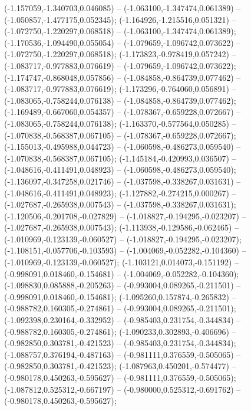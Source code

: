  (-1.157059,-1.340703,0.046085) -- (-1.063100,-1.347474,0.061389) -- (-1.050857,-1.477175,0.052345);
 (-1.164926,-1.215516,0.051321) -- (-1.072750,-1.220297,0.068518) -- (-1.063100,-1.347474,0.061389);
 (-1.170536,-1.094490,0.055054) -- (-1.079659,-1.096742,0.073622) -- (-1.072750,-1.220297,0.068518);
 (-1.173823,-0.978419,0.057242) -- (-1.083717,-0.977883,0.076619) -- (-1.079659,-1.096742,0.073622);
 (-1.174747,-0.868048,0.057856) -- (-1.084858,-0.864739,0.077462) -- (-1.083717,-0.977883,0.076619);
 (-1.173296,-0.764060,0.056891) -- (-1.083065,-0.758244,0.076138) -- (-1.084858,-0.864739,0.077462);
 (-1.169489,-0.667060,0.054357) -- (-1.078367,-0.659228,0.072667) -- (-1.083065,-0.758244,0.076138);
 (-1.163370,-0.577564,0.050285) -- (-1.070838,-0.568387,0.067105) -- (-1.078367,-0.659228,0.072667);
 (-1.155013,-0.495988,0.044723) -- (-1.060598,-0.486273,0.059540) -- (-1.070838,-0.568387,0.067105);
 (-1.145184,-0.420993,0.036507) -- (-1.048616,-0.411491,0.048923) -- (-1.060598,-0.486273,0.059540);
 (-1.136097,-0.347258,0.021746) -- (-1.037598,-0.338267,0.031631) -- (-1.048616,-0.411491,0.048923);
 (-1.127882,-0.274215,0.000267) -- (-1.027687,-0.265938,0.007543) -- (-1.037598,-0.338267,0.031631);
 (-1.120506,-0.201708,-0.027829) -- (-1.018827,-0.194295,-0.023207) -- (-1.027687,-0.265938,0.007543);
 (-1.113938,-0.129586,-0.062465) -- (-1.010969,-0.123139,-0.060527) -- (-1.018827,-0.194295,-0.023207);
 (-1.108151,-0.057706,-0.103593) -- (-1.004069,-0.052282,-0.104360) -- (-1.010969,-0.123139,-0.060527);
 (-1.103121,0.014073,-0.151192) -- (-0.998091,0.018460,-0.154681) -- (-1.004069,-0.052282,-0.104360);
 (-1.098830,0.085888,-0.205263) -- (-0.993004,0.089265,-0.211501) -- (-0.998091,0.018460,-0.154681);
 (-1.095260,0.157874,-0.265832) -- (-0.988782,0.160305,-0.274861) -- (-0.993004,0.089265,-0.211501);
 (-1.092398,0.230164,-0.332952) -- (-0.985403,0.231754,-0.344834) -- (-0.988782,0.160305,-0.274861);
 (-1.090233,0.302893,-0.406696) -- (-0.982850,0.303781,-0.421523) -- (-0.985403,0.231754,-0.344834);
 (-1.088757,0.376194,-0.487163) -- (-0.981111,0.376559,-0.505065) -- (-0.982850,0.303781,-0.421523);
 (-1.087963,0.450201,-0.574477) -- (-0.980178,0.450263,-0.595627) -- (-0.981111,0.376559,-0.505065);
 (-1.087812,0.525312,-0.667197) -- (-0.980000,0.525312,-0.691762) -- (-0.980178,0.450263,-0.595627);
